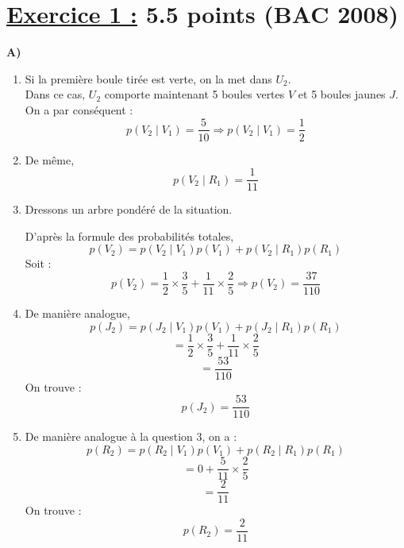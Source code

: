 \documentclass[12pt,a4paper]{article}
\begin{document}
\section*{\underline{Exercice 1 :} 5.5 points (BAC 2008)}
\textbf{A)} 
\begin{enumerate}
    \item Si la première boule tirée est verte, on la met dans $U_2$.\\
Dans ce cas, $U_2$ comporte maintenant 5 boules vertes $V$ et 5 boules jaunes $J$.\\
On a par conséquent : 
\[
p(V_2 \mid V_1) = \frac{5}{10} \Rightarrow p(V_2 \mid V_1) = \frac{1}{2}
\]

\item  De même,
\[
p(V_2 \mid R_1) = \frac{1}{11}
\]

\item  Dressons un arbre pondéré de la situation.


D'après la formule des probabilités totales, 
\[
p(V_2) = p(V_2 \mid V_1) p(V_1) + p(V_2 \mid R_1) p(R_1)
\]
Soit :
\[
p(V_2) = \frac{1}{2} \times \frac{3}{5} + \frac{1}{11} \times \frac{2}{5} \Rightarrow p(V_2) = \frac{37}{110}
\]

\item  De manière analogue,
\[
p(J_2) = p(J_2 \mid V_1) p(V_1) + p(J_2 \mid R_1) p(R_1)
\]
\[
= \frac{1}{2} \times \frac{3}{5} + \frac{1}{11} \times \frac{2}{5}
\]
\[
= \frac{53}{110}
\]
On trouve :
\[
p(J_2) = \frac{53}{110}
\]

\item  De manière analogue à la question 3, on a :
\[
p(R_2) = p(R_2 \mid V_1) p(V_1) + p(R_2 \mid R_1) p(R_1)
\]
\[
= 0 + \frac{5}{11} \times \frac{2}{5}
\]
\[
= \frac{2}{11}
\]
On trouve :
\[
p(R_2) = \frac{2}{11}
\]
\end{enumerate}
\end{document}
